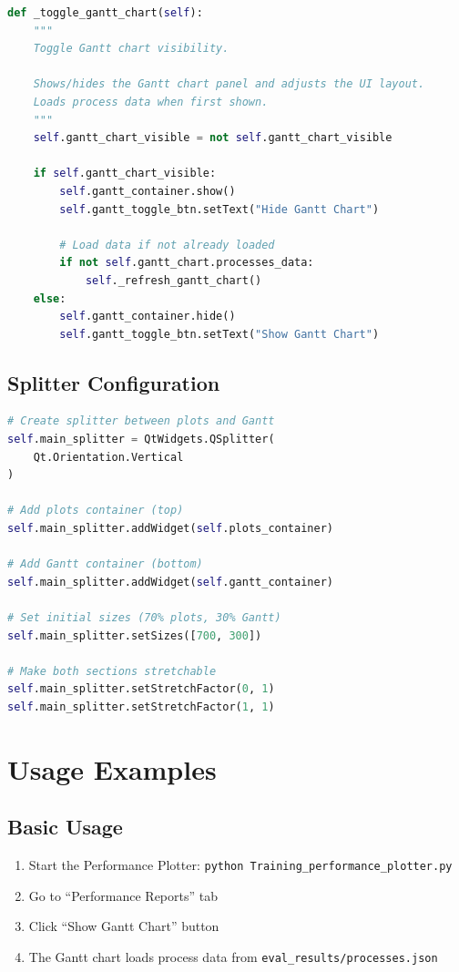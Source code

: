\documentclass[11pt,a4paper]{article}
\begin{document}
\begin{lstlisting}[language=Python]
def _toggle_gantt_chart(self):
    """
    Toggle Gantt chart visibility.
    
    Shows/hides the Gantt chart panel and adjusts the UI layout.
    Loads process data when first shown.
    """
    self.gantt_chart_visible = not self.gantt_chart_visible
    
    if self.gantt_chart_visible:
        self.gantt_container.show()
        self.gantt_toggle_btn.setText("Hide Gantt Chart")
        
        # Load data if not already loaded
        if not self.gantt_chart.processes_data:
            self._refresh_gantt_chart()
    else:
        self.gantt_container.hide()
        self.gantt_toggle_btn.setText("Show Gantt Chart")
\end{lstlisting}

\subsection{Splitter Configuration}

\begin{lstlisting}[language=Python]
# Create splitter between plots and Gantt
self.main_splitter = QtWidgets.QSplitter(
    Qt.Orientation.Vertical
)

# Add plots container (top)
self.main_splitter.addWidget(self.plots_container)

# Add Gantt container (bottom)
self.main_splitter.addWidget(self.gantt_container)

# Set initial sizes (70% plots, 30% Gantt)
self.main_splitter.setSizes([700, 300])

# Make both sections stretchable
self.main_splitter.setStretchFactor(0, 1)
self.main_splitter.setStretchFactor(1, 1)
\end{lstlisting}

\section{Usage Examples}

\subsection{Basic Usage}

\begin{enumerate}
    \item Start the Performance Plotter: \texttt{python Training\_performance\_plotter.py}
    \item Go to ``Performance Reports'' tab
    \item Click ``Show Gantt Chart'' button
    \item The Gantt chart loads process data from \texttt{eval\_results/processes.json}
\end{enumerate}
\end{document}

